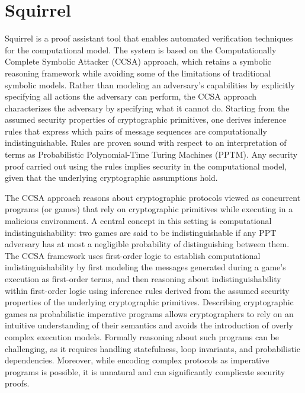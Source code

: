 \section{Squirrel}
Squirrel is a proof assistant tool that enables automated verification techniques for the computational model. The system is based on the Computationally Complete Symbolic Attacker (CCSA) approach, which retains a symbolic reasoning framework while avoiding some of the limitations of traditional symbolic models. Rather than modeling an adversary's capabilities by explicitly specifying all actions the adversary can perform, the CCSA approach characterizes the adversary by specifying what it cannot do. Starting from the assumed security properties of cryptographic primitives, one derives inference rules that express which pairs of message sequences are computationally indistinguishable. Rules are proven sound with respect to an interpretation of terms as Probabilistic Polynomial-Time Turing Machines (PPTM). Any security proof carried out using the rules implies security in the computational model, given that the underlying cryptographic assumptions hold.

The CCSA approach reasons about cryptographic protocols viewed as concurrent programs (or games) that rely on cryptographic primitives while executing in a malicious environment. A central concept in this setting is computational indistinguishability: two games are said to be indistinguishable if any PPT adversary has at most a negligible probability of distinguishing between them. The CCSA framework uses first-order logic to establish computational indistinguishability by first modeling the messages generated during a game's execution as first-order terms, and then reasoning about indistinguishability within first-order logic using inference rules derived from the assumed security properties of the underlying cryptographic primitives. Describing cryptographic games as probabilistic imperative programs allows cryptographers to rely on an intuitive understanding of their semantics and avoids the introduction of overly complex execution models. Formally reasoning about such programs can be challenging, as it requires handling statefulness, loop invariants, and probabilistic dependencies. Moreover, while encoding complex protocols as imperative programs is possible, it is unnatural and can significantly complicate security proofs.

